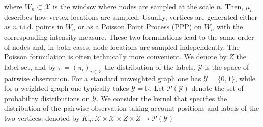\documentclass[runningheads]{llncs}
\begin{document}
where \(W_n \subset \mathcal X\) is the window where nodes are sampled at the scale $n$.  
Then, \(\mu_n\) describes how vertex locations are sampled. Usually, vertices are generated either as \(n\) i.i.d. points in \(W_n\) or as a Poisson Point Process (PPP) on \(W_n\) with the corresponding intensity measure. These two formulations lead to the same order of nodes and, in both cases, node locations are sampled independently. The Poisson formulation is often technically more convenient.
We denote by \(Z\) the label set, and by \(\pi=(\pi_i)_{i\in Z} \) the distribution of the labels.
\(\mathcal Y\) is the space of pairwise observation. For a standard unweighted graph one has \(\mathcal Y=\{0,1\}\), while for a weighted graph one typically takes \(\mathcal Y=\mathbb{R}\).
Let \(\mathcal P(\mathcal Y)\) denote the set of probability distributions on \(\mathcal Y\). We consider the kernel that specifies the distribution of the pairwise observation taking account positions and labels of the two vertices, denoted by
\(
K_n : \mathcal{X} \times \mathcal{X} \times Z \times Z \to \mathcal P(\mathcal Y)
\)

\end{document}
